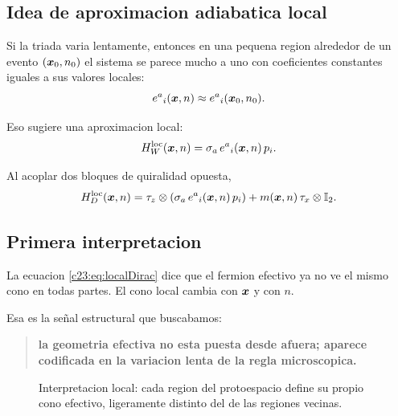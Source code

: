 \subsection{Idea de aproximacion adiabatica local}
Si la triada varia lentamente, entonces en una pequena region alrededor de un evento \((\bm{x}_0,n_0)\) el sistema se parece mucho a uno con coeficientes constantes iguales a sus valores locales:
\begin{equation}
e^a{}_i(\bm{x},n)\approx e^a{}_i(\bm{x}_0,n_0).
\end{equation}

Eso sugiere una aproximacion local:
\begin{equation}
H_W^{\mathrm{loc}}(\bm{x},n)
=
\sigma_a\, e^a{}_i(\bm{x},n)\, p_i.
\label{c23:eq:localWeyl}
\end{equation}

Al acoplar dos bloques de quiralidad opuesta,
\begin{equation}
H_D^{\mathrm{loc}}(\bm{x},n)
=
\tau_z\otimes\left(\sigma_a\, e^a{}_i(\bm{x},n)\, p_i\right)
+m(\bm{x},n)\,\tau_x\otimes\mathbb{I}_2.
\label{c23:eq:localDirac}
\end{equation}

\subsection{Primera interpretacion}
La ecuacion \eqref{c23:eq:localDirac} dice que el fermion efectivo ya no ve el mismo cono en todas partes. El cono local cambia con \(\bm{x}\) y con \(n\).

Esa es la señal estructural que buscabamos:
\begin{quote}
\textbf{la geometria efectiva no esta puesta desde afuera; aparece codificada en la variacion lenta de la regla microscopica.}
\end{quote}

\begin{figure}[h!]
\centering
{}
\caption{Interpretacion local: cada region del protoespacio define su propio cono efectivo, ligeramente distinto del de las regiones vecinas.}
\end{figure}

